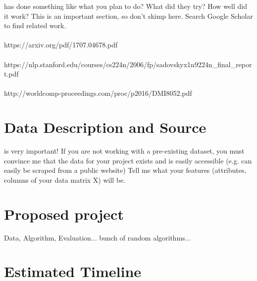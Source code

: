 \documentclass[journal]{IEEEtran}
\begin{document}
 has done something like what you plan to do?  What did they try?  How well did it work? This is an important section, so don't skimp here. Search Google Scholar to find related work. \\\\https://arxiv.org/pdf/1707.04678.pdf \\ \\ https://nlp.stanford.edu/courses/cs224n/2006/fp/sadovsky\-x1n9\-224n\_final\_report.pdf \\ \\ http://worldcomp-proceedings.com/proc/p2016/DMI8052.pdf\\


\section{Data Description and Source}

 is very important! If you are not working with a pre-existing dataset, you must convince me that the data for your project exists and is easily accessible (e.g. can easily be scraped from a public website) Tell me what your features (attributes, columns of your data matrix X) will be.


\section{Proposed project}

Data, Algorithm, Evaluation... bunch of random algorithms...


\newpage

\section{Estimated Timeline}
\end{document}
